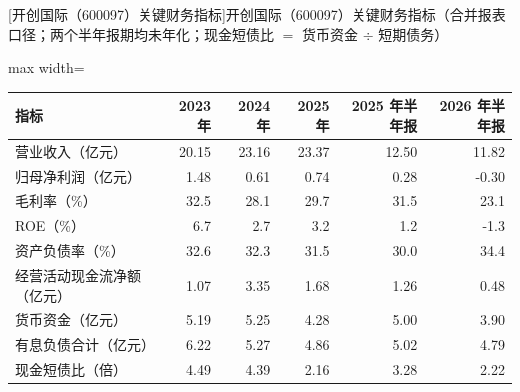 \begin{center}\small\setlength{\tabcolsep}{3.4pt}
[开创国际（600097）关键财务指标]{开创国际（600097）关键财务指标（合并报表口径；两个半年报期均未年化；现金短债比 $=$ 货币资金 $\div$ 短期债务）}
\begin{adjustbox}{max width=\textwidth}
\begin{tabular}{@{}lrrrrr@{}}
\toprule
指标 & 2023 年 & 2024 年 & 2025 年 & 2025 年半年报 & 2026 年半年报 \\
\midrule
营业收入（亿元） & 20.15 & 23.16 & 23.37 & 12.50 & 11.82 \\
归母净利润（亿元） & 1.48 & 0.61 & 0.74 & 0.28 & -0.30 \\
毛利率（\%） & 32.5 & 28.1 & 29.7 & 31.5 & 23.1 \\
ROE（\%） & 6.7 & 2.7 & 3.2 & 1.2 & -1.3 \\
资产负债率（\%） & 32.6 & 32.3 & 31.5 & 30.0 & 34.4 \\
经营活动现金流净额（亿元） & 1.07 & 3.35 & 1.68 & 1.26 & 0.48 \\
货币资金（亿元） & 5.19 & 5.25 & 4.28 & 5.00 & 3.90 \\
有息负债合计（亿元） & 6.22 & 5.27 & 4.86 & 5.02 & 4.79 \\
现金短债比（倍） & 4.49 & 4.39 & 2.16 & 3.28 & 2.22 \\
\bottomrule
\end{tabular}
\end{adjustbox}
\end{center}

